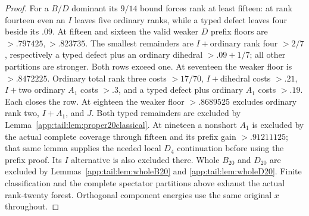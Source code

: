 \begin{proof}
For a $B/D$ dominant its $9/14$ bound forces rank at least
fifteen: at rank fourteen even an $I$ leaves five ordinary
ranks, while a typed defect leaves four beside its $.09$.
At fifteen and sixteen the valid weaker $D$ prefix floors
are $>.797425,>.823735$. The smallest remainders are
$I+$ordinary rank four $>2/7$, respectively a typed defect
plus an ordinary dihedral $>.09+1/7$; all other partitions
are stronger. Both rows exceed one.
At seventeen the weaker floor is $>.8472225$.
Ordinary total rank three costs $>17/70$, $I+$dihedral costs
$>.21$, $I+$two ordinary $A_1$ costs $>.3$, and a typed
defect plus ordinary $A_1$ costs $>.19$. Each closes the row.
At eighteen the weaker floor $>.8689525$ excludes ordinary
rank two, $I+A_1$, and $J$. Both typed remainders are excluded
by Lemma~\ref{app:tail:lem:proper20classical}.
At nineteen a nonshort $A_1$ is excluded by the actual complete
coverage through fifteen and its prefix gain $>.91211125$;
that same lemma supplies the needed local $D_4$ continuation
before using the prefix proof. Its $I$ alternative is also
excluded there. Whole $B_{20}$ and $D_{20}$ are excluded by
Lemmas~\ref{app:tail:lem:wholeB20} and
\ref{app:tail:lem:wholeD20}.
Finite classification and the complete spectator partitions above
exhaust the actual rank-twenty forest. Orthogonal component
energies use the same original $x$ throughout.
\end{proof}

